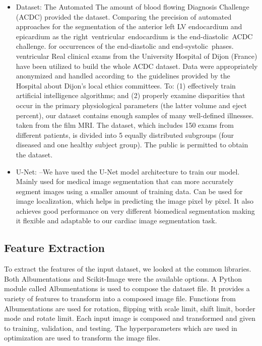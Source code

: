 \documentclass[runningheads]{llncs}
\begin{document}
\begin{itemize}
    \item Dataset: The Automated The amount of blood flowing Diagnosis Challenge (ACDC) provided the dataset. Comparing the precision of automated approaches for the segmentation of the anterior left LV endocardium and epicardium as the right ventricular endocardium is the end-diastolic ACDC challenge. for occurrences of the end-diastolic and end-systolic phases. ventricular Real clinical exams from the University Hospital of Dijon (France) have been utilized to build the whole ACDC dataset. Data were appropriately anonymized and handled according to the guidelines provided by the Hospital about Dijon's local ethics committees. To: (1) effectively train artificial intelligence algorithms; and (2) properly examine disparities that occur in the primary physiological parameters (the latter volume and eject percent), our dataset contains enough samples of many well-defined illnesses. taken from the film MRI. The dataset, which includes 150 exams from different patients, is divided into 5 equally distributed subgroups (four diseased and one healthy subject group). The public is permitted to obtain the dataset.
    \item U-Net: –We have used the U-Net model architecture to train our model. Mainly used for medical image segmentation that can more accurately segment images using a smaller amount of training data. Can be used for image localization, which helps in predicting the image pixel by pixel. It also achieves good performance on very different biomedical segmentation making it flexible and adaptable to our cardiac image segmentation task.
\end{itemize}

\subsection{Feature Extraction}
To extract the features of the input dataset, we looked at the common libraries. Both Albumentations and Scikit-Image were the available options. A Python module called Albumentations is used to compose the dataset file. It provides a variety of features to transform into a composed image file. Functions from Albumentations are used for rotation, flipping with scale limit, shift limit, border mode and rotate limit. Each input image is composed and transformed and given to training, validation, and testing. The hyperparameters which are used in optimization are used to transform the image files.
   
\end{document}
